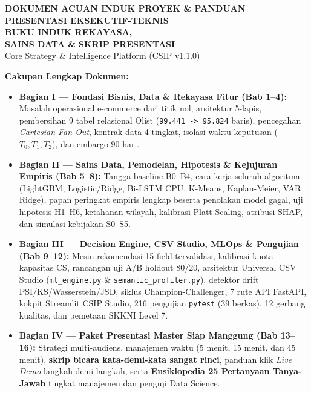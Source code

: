 \documentclass[11pt,a4paper,oneside]{book}
\newcommand{\code}[1]{{\small\nolinkurl{#1}}}
\begin{document}
\frontmatter

\begin{titlepage}
\thispagestyle{empty}
\begin{tcolorbox}[colback=csipDark, colframe=csipDark, arc=0pt, left=18pt, right=18pt, top=24pt, bottom=24pt]
{\color{csipAccent}\bfseries\large DOKUMEN ACUAN INDUK PROYEK \& PANDUAN PRESENTASI EKSEKUTIF-TEKNIS}\\[10pt]
{\color{white}\bfseries\fontsize{22}{28}\selectfont BUKU INDUK REKAYASA,\\[3pt] SAINS DATA \& SKRIP PRESENTASI}\\[10pt]
{\color{csipAccent!35!white}\Large Core Strategy \& Intelligence Platform (CSIP v1.1.0)}
\end{tcolorbox}

\vspace{1.0cm}
\large
\textbf{Cakupan Lengkap Dokumen:}
\begin{itemize}
  \item \textbf{Bagian I --- Fondasi Bisnis, Data \& Rekayasa Fitur (Bab 1--4):} Masalah operasional e-commerce dari titik nol, arsitektur 5-lapis, pembersihan 9 tabel relasional Olist (\code{99.441 -> 95.824} baris), pencegahan \emph{Cartesian Fan-Out}, kontrak data 4-tingkat, isolasi waktu keputusan ($T_0, T_1, T_2$), dan embargo 90 hari.
  \item \textbf{Bagian II --- Sains Data, Pemodelan, Hipotesis \& Kejujuran Empiris (Bab 5--8):} Tangga baseline B0--B4, cara kerja seluruh algoritma (LightGBM, Logistic/Ridge, Bi-LSTM CPU, K-Means, Kaplan-Meier, VAR Ridge), papan peringkat empiris lengkap beserta penolakan model gagal, uji hipotesis H1--H6, ketahanan wilayah, kalibrasi Platt Scaling, atribusi SHAP, dan simulasi kebijakan S0--S5.
  \item \textbf{Bagian III --- Decision Engine, CSV Studio, MLOps \& Pengujian (Bab 9--12):} Mesin rekomendasi 15 field tervalidasi, kalibrasi kuota kapasitas CS, rancangan uji A/B holdout 80/20, arsitektur Universal CSV Studio (\code{ml_engine.py} \& \code{semantic_profiler.py}), detektor drift PSI/KS/Wasserstein/JSD, siklus Champion-Challenger, 7 rute API FastAPI, kokpit Streamlit CSIP Studio, 216 pengujian \code{pytest} (39 berkas), 12 gerbang kualitas, dan pemetaan SKKNI Level 7.
  \item \textbf{Bagian IV --- Paket Presentasi Master Siap Manggung (Bab 13--16):} Strategi multi-audiens, manajemen waktu (5 menit, 15 menit, dan 45 menit), \textbf{skrip bicara kata-demi-kata sangat rinci}, panduan klik \emph{Live Demo} langkah-demi-langkah, serta \textbf{Ensiklopedia 25 Pertanyaan Tanya-Jawab} tingkat manajemen dan penguji Data Science.
\end{itemize}


\end{titlepage}
\end{document}

